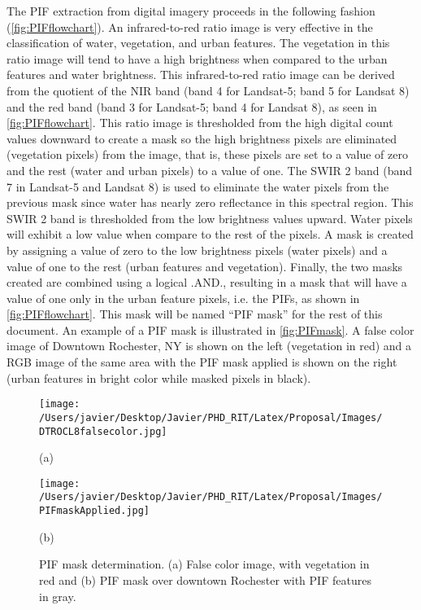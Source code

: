 The PIF extraction from digital imagery proceeds in the following fashion (\autoref{fig:PIFflowchart}). An infrared-to-red ratio image is very effective in the classification of water, vegetation, and urban features. The vegetation in this ratio image will tend to have a high brightness when compared to the urban features and water brightness. This infrared-to-red ratio image can be derived from the quotient of the NIR band (band 4 for Landsat-5; band 5 for Landsat 8) and the red band (band 3 for Landsat-5; band 4 for Landsat 8), as seen in \autoref{fig:PIFflowchart}. This ratio image is thresholded from the high digital count values downward to create a mask so the high brightness pixels are eliminated (vegetation pixels) from the image, that is, these pixels are set to a value of zero and the rest (water and urban pixels) to a value of one. The SWIR 2 band (band 7 in Landsat-5 and Landsat 8) is used to eliminate the water pixels from the previous mask since water has nearly zero reflectance in this spectral region. This SWIR 2 band is thresholded from the low brightness values upward. Water pixels will exhibit a low value when compare to the rest of the pixels. A mask is created by assigning a value of zero to the low brightness pixels (water pixels) and a value of one to the rest (urban features and vegetation). Finally, the two masks created are combined using a logical .AND., resulting in a mask that will have a value of one only in the urban feature pixels, i.e. the PIFs, as shown in \autoref{fig:PIFflowchart}. This mask will be named ``PIF mask'' for the rest of this document. An example of a PIF mask is illustrated in \autoref{fig:PIFmask}. A false color image of Downtown Rochester, NY is shown on the left (vegetation in red) and a RGB image of the same area with the PIF mask applied is shown on the right (urban features in bright color while masked pixels in black).

\begin{figure}[htb]
  \begin{minipage}[c]{0.48\linewidth}
    \centering
      \texttt{[image: /Users/javier/Desktop/Javier/PHD\_RIT/Latex/Proposal/Images/DTROCL8falsecolor.jpg]}  
    \centerline{(a)}\medskip
  \end{minipage}
  \hfill
  \begin{minipage}[d]{0.48\linewidth}
    \centering
      \texttt{[image: /Users/javier/Desktop/Javier/PHD\_RIT/Latex/Proposal/Images/PIFmaskApplied.jpg]}
    \centerline{(b)}\medskip
  \end{minipage}
  \caption{PIF mask determination. (a) False color image, with vegetation in red and (b) PIF mask over downtown Rochester with PIF features in gray. \label{fig:PIFmask} } 
\end{figure}

